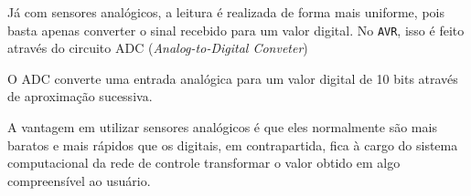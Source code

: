 Já com sensores analógicos, a leitura é realizada de forma mais uniforme, pois basta apenas converter o sinal
recebido para um valor digital. No \texttt{AVR}, isso é feito através do circuito ADC (\textit{Analog-to-Digital
Conveter})

O ADC converte uma entrada analógica para um valor digital de 10 bits através de aproximação sucessiva.

A vantagem em utilizar sensores analógicos é que eles normalmente são mais baratos e mais rápidos que os
digitais, em contrapartida, fica à cargo do sistema computacional da rede de controle transformar o valor
obtido em algo compreensível ao usuário.
